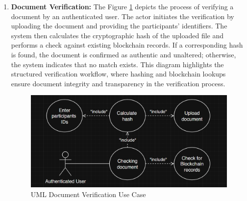 \begin{enumerate}
    \item \textbf{Document Verification:} The Figure \ref{uml-use-verify} depicts the process of verifying a document by an authenticated user. The actor initiates the verification by uploading the document and providing the participants’ identifiers. The system then calculates the cryptographic hash of the uploaded file and performs a check against existing blockchain records. If a corresponding hash is found, the document is confirmed as authentic and unaltered; otherwise, the system indicates that no match exists. This diagram highlights the structured verification workflow, where hashing and blockchain lookups ensure document integrity and transparency in the verification process.
    \begin{figure}[H]
        \centering
        \includegraphics[width=18cm]{"images/umlDiagrams/uml-use-verify.png"}
        \caption{UML Document Verification Use Case}
        \label{uml-use-verify}
    \end{figure}


\end{enumerate}
